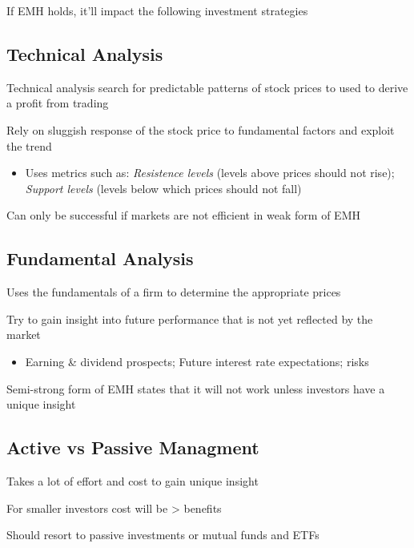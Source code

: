 \documentclass[]{book}
\providecommand{\tightlist}{%
  \setlength{\itemsep}{0pt}\setlength{\parskip}{0pt}}
\theoremstyle{definition}
\theoremstyle{definition}
\theoremstyle{remark}
\begin{document}
If EMH holds, it'll impact the following investment strategies

\subsection{Technical Analysis}\label{technical-analysis}

Technical analysis search for predictable patterns of stock prices to
used to derive a profit from trading

Rely on sluggish response of the stock price to fundamental factors and
exploit the trend

\begin{itemize}
\tightlist
\item
  Uses metrics such as: \emph{Resistence levels} (levels above prices
  should not rise); \emph{Support levels} (levels below which prices
  should not fall)
\end{itemize}

Can only be successful if markets are not efficient in weak form of EMH

\subsection{Fundamental Analysis}\label{fundamental-analysis}

Uses the fundamentals of a firm to determine the appropriate prices

Try to gain insight into future performance that is not yet reflected by
the market

\begin{itemize}
\tightlist
\item
  Earning \& dividend prospects; Future interest rate expectations;
  risks
\end{itemize}

Semi-strong form of EMH states that it will not work unless investors
have a unique insight

\subsection{Active vs Passive
Managment}\label{active-vs-passive-managment}

Takes a lot of effort and cost to gain unique insight

For smaller investors cost will be \textgreater{} benefits

Should resort to passive investments or mutual funds and ETFs
\end{document}
